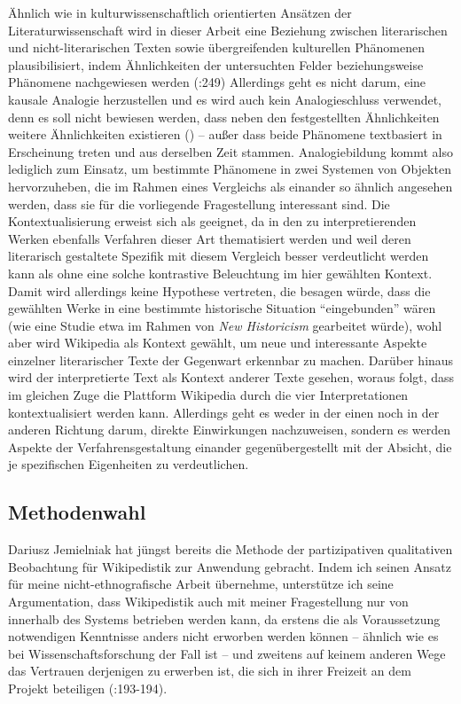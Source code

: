 \documentclass[fontsize=12pt]{scrartcl}
\begin{document}
\"Ahnlich wie in kulturwissenschaftlich orientierten Ans\"atzen der Li\-te\-ra\-tur\-wis\-sen\-schaft wird in dieser Arbeit eine Beziehung zwischen li\-te\-ra\-rischen und nicht-li\-te\-ra\-rischen Texten sowie \"ubergreifenden kulturellen Ph\"anomenen plausibilisiert, indem \"Ahnlichkeiten der untersuchten Felder beziehungsweise Ph\"anomene nachgewiesen werden (\cite{KoppeWinko2013}:249) Al\-ler\-dings geht es nicht darum, eine kausale Analogie herzustellen und es wird auch kein Analogieschluss verwendet, denn es soll nicht bewiesen werden, dass neben den festgestellten \"Ahnlichkeiten weitere \"Ahnlichkeiten existieren (\cite{Bartha2013}) -- au{\ss}er dass beide Ph\"anomene textbasiert in Erscheinung treten und aus derselben Zeit stammen. Analogiebildung kommt also lediglich zum Einsatz, um bestimmte Ph\"anomene in zwei Systemen von Objekten hervorzuheben, die im Rahmen eines Vergleichs als einander so \"ahnlich angesehen werden, dass sie f\"ur die vorliegende Fragestellung interessant sind. Die Kontextualisierung erweist sich als ge\-eig\-net, da in den zu interpretierenden Werken ebenfalls Verfahren dieser Art thematisiert werden und weil deren li\-te\-ra\-risch gestaltete Spezifik mit diesem Vergleich besser verdeutlicht werden kann als ohne eine solche kontrastive Beleuchtung im \mbox{hier} gew\"ahlten Kontext. Damit wird al\-ler\-dings keine Hypothese vertreten, die besagen w\"urde, dass die gew\"ahlten Werke in eine bestimmte historische Situation "`eingebunden"' w\"aren (wie eine Studie etwa im Rahmen von \textit{New Historicism} gearbeitet w\"urde), wohl aber wird Wi\-ki\-pe\-dia als Kontext gew\"ahlt, um neue und interessante Aspekte einzelner li\-te\-ra\-rischer Texte der Gegenwart erkennbar zu machen. Dar\"uber hinaus wird der interpretierte Text als Kontext an\-de\-rer Texte gesehen, woraus folgt, dass im gleichen Zuge die Plattform Wi\-ki\-pe\-dia durch die \mbox{vier} Interpretationen kontextualisiert werden kann. Al\-ler\-dings geht es weder in der einen noch in der anderen Richtung darum, direkte Einwirkungen nachzuweisen, sondern es werden Aspekte der Verfahrensgestaltung einander gegen\"ubergestellt mit der Absicht, die je spezifischen Eigenheiten zu verdeutlichen.

\subsection{Methodenwahl}
\label{subsec:2.6}

Dariusz Jemielniak hat j\"ungst bereits die Methode der partizipativen qualitativen Beobachtung f\"ur Wikipedistik zur Anwendung gebracht. Indem ich seinen Ansatz f\"ur meine nicht-ethnografische Arbeit \"ubernehme, unterst\"utze ich seine Argumentation, dass Wikipedistik auch mit meiner Fragestellung nur von innerhalb des Systems betrieben werden kann, da erstens die als Voraussetzung notwendigen Kenntnisse anders nicht erworben werden k\"onnen -- \"ahnlich wie es bei Wissenschaftsfor\-schung der Fall ist -- und zweitens auf keinem anderen Wege das Vertrauen derjenigen zu erwerben ist, die sich in ihrer Freizeit an dem Projekt beteiligen (\cite{Jemielniak2014}:193-194).
\end{document}
